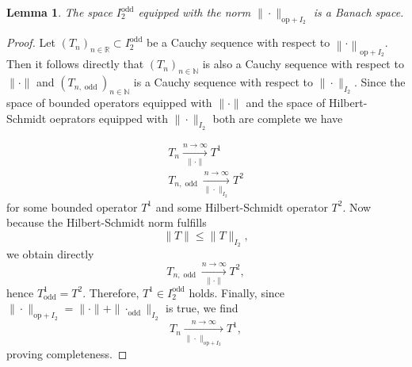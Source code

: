 \documentclass[b5paper,draft,openbib,12pt]{memoir}
\newtheorem{Lemma}[Def]{Lemma}
\DeclareMathOperator{\odd}{odd}
\begin{document}
\begin{Lemma}\label{completeness of I_2 odd}
The space \(I_2^{\odd}\)
equipped with the norm 
\(\|\cdot\|_{\mathrm{op}+I_2}\) is a 
Banach space.
\end{Lemma}
\begin{proof}
Let \((T_n)_{n\in\mathbb{R}}\subset I_2^{\odd}\)
be a Cauchy sequence with 
respect to \(\left\|\cdot\right\|_{\mathrm{op}+I_2}\). 
Then it follows directly that 
\((T_n)_{n\in\mathbb{N}}\)
is also a Cauchy sequence with 
respect to \(\|\cdot\|\) and
\((T_{n,\odd})_{n\in\mathbb{N}}\) is a Cauchy
sequence with respect to
\(\|\cdot\|_{I_2}\). Since 
the space of bounded operators equipped with
\(\|\cdot\|\) and
the space of Hilbert-Schmidt oeprators 
equipped with \(\|\cdot\|_{I_2}\) both are
complete we have

\begin{align}
T_n\xrightarrow[\|\cdot\|]{n\rightarrow \infty} T^1\\
T_{n,\odd}\xrightarrow[\|\cdot\|_{I_2}]{n\rightarrow \infty} T^2
\end{align}
for some bounded operator \(T^1\) and some 
Hilbert-Schmidt operator \(T^2\). Now because 
the Hilbert-Schmidt norm  fulfills
\begin{equation}
\|T\|\le \|T\|_{I_2},
\end{equation} 
we obtain directly
\begin{equation}
T_{n,\odd}\xrightarrow[\|\cdot\|]{n\rightarrow \infty} T^2,
\end{equation}
hence \(T^1_{\odd}=T^2\). 
Therefore, \(T^1\in I_2^{\odd}\) holds. 
Finally, since 
\(\|\cdot\|_{\mathrm{op}+I_2}
=\|\cdot\|+\|\cdot_{\odd}\|_{I_2}\) is true, 
we find 
\begin{equation}
T_n\xrightarrow[\|\cdot\|_{\mathrm{op}+I_2}]{n\rightarrow \infty} T^1,
\end{equation}
proving completeness.
\end{proof}
\end{document}
